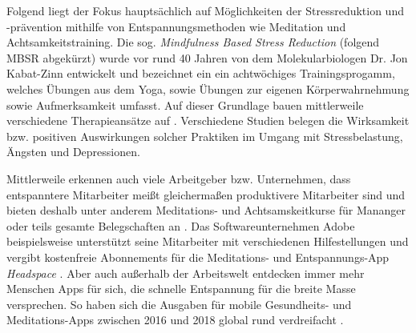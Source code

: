 Folgend liegt der Fokus hauptsächlich auf Möglichkeiten der Stressreduktion und -prävention mithilfe von Entspannungsmethoden wie Meditation und Achtsamkeitstraining.
Die sog. \textit{Mindfulness Based Stress Reduction} (folgend MBSR abgekürzt) wurde vor rund 40 Jahren von dem Molekularbiologen Dr. Jon Kabat-Zinn entwickelt und bezeichnet ein ein achtwöchiges Trainingsprogamm, welches Übungen aus dem Yoga, sowie Übungen zur eigenen Körperwahrnehmung sowie Aufmerksamkeit umfasst. Auf dieser Grundlage bauen mittlerweile verschiedene Therapieansätze auf . Verschiedene Studien belegen die Wirksamkeit bzw. positiven Auswirkungen solcher Praktiken im Umgang mit Stressbelastung, Ängsten und Depressionen.




Mittlerweile erkennen auch viele Arbeitgeber bzw. Unternehmen, dass entspanntere Mitarbeiter meißt gleichermaßen produktivere Mitarbeiter sind und bieten deshalb unter anderem Meditations- und Achtsamskeitkurse für Mananger oder teils gesamte Belegschaften an . Das Softwareunternehmen Adobe beispielsweise unterstützt seine Mitarbeiter mit verschiedenen Hilfestellungen und vergibt kostenfreie Abonnements für die Meditations- und Entspannungs-App \textit{Headspace} . 
Aber auch außerhalb der Arbeitswelt entdecken immer mehr Menschen Apps für sich, die schnelle Entspannung für die breite Masse versprechen. So haben sich die Ausgaben für mobile Gesundheits- und Meditations-Apps zwischen 2016 und 2018 global rund verdreifacht .